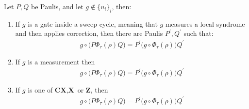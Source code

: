 \begin{claim}
  Let $P,Q$ be Paulis, and let $g \notin \{u_{i}\}_{i}$, then: 
  \begin{enumerate}
    \item If $g$ is a gate inside a sweep cycle, meaning that $g$ measures a local syndrome and then applies correction, then there are Paulis $P^{\prime}, Q^{\prime}$ such that:
      \begin{equation*}
        \begin{split}
          g \circ \bigl( P \Phi_{\tau}(\rho) Q \bigr) = P^{\prime} \bigl( g \circ \Phi_{\tau}(\rho) \bigr) Q^{\prime}
        \end{split}
      \end{equation*}
     \item If $g$ is a measurement then   
      \begin{equation*}
        \begin{split}
          g \circ \bigl( P \Phi_{\tau}(\rho) Q \bigr) = P^{\prime} \bigl( g \circ \Phi_{\tau}(\rho) \bigr) Q^{\prime}
        \end{split}
      \end{equation*}
    \item If $g$ is one of $\textbf{CX}, \textbf{X}$ or $\textbf{Z}$, then 
      \begin{equation*}
        \begin{split}
          g \circ \bigl( P \Phi_{\tau}(\rho) Q \bigr) = P^{\prime} \bigl( g \circ \Phi_{\tau}(\rho) \bigr) Q^{\prime}
        \end{split}
      \end{equation*}
  \end{enumerate}
\end{claim}
